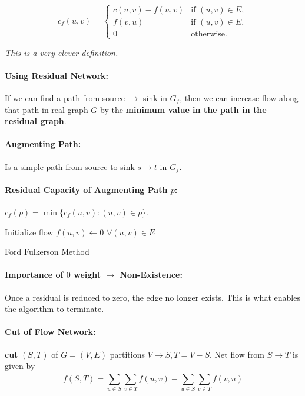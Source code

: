 \documentclass[a4paper,12pt]{report}
\begin{document}
\begin{equation}
c_f(u,v) = \begin{cases}
c(u,v) - f(u,v) & \text{if } (u,v)\in E,\\
f(v,u) & \text{if } (u,v) \in E,\\
0 & \text{otherwise}.
\end{cases}
\end{equation}

\textit{This is a very clever definition.} 

\paragraph{Using Residual Network: } If we can find a path from source $\to$ sink in $G_f$, then we can increase flow along that path in real graph $G$ by the \textbf{minimum value in the path in the residual graph}. 

\paragraph{Augmenting Path: } Is a simple path from source to sink $s\to t$ in $G_f$.

\paragraph{Residual Capacity of Augmenting Path $p$: } $c_f(p) = \min\{c_f(u,v):(u,v)\in p\}$.


\begin{algorithm}[H]
\SetAlgoLined
{}
	\BlankLine
	\BlankLine
	Initialize flow $f(u,v) \leftarrow 0$ $\forall (u,v)\in E$\;
	\caption{Ford Fulkerson Method}
\end{algorithm}


\paragraph{Importance of $0$ weight $\to$ Non-Existence: } Once a residual is reduced to zero, the edge no longer exists. This is what enables the algorithm to terminate. 

\paragraph{Cut of Flow Network: } \textbf{cut} $(S,T)$ of $G = (V,E)$ partitions $V\to S,T=V-S$. Net flow from $S\to T$ is given by 
\begin{equation}
f(S,T) = \sum_{u\in S}^{} \sum_{v\in T}^{} f(u,v) - \sum_{u\in S}^{} \sum_{v\in T}^{} f(v,u)
\end{equation}
\end{document}
